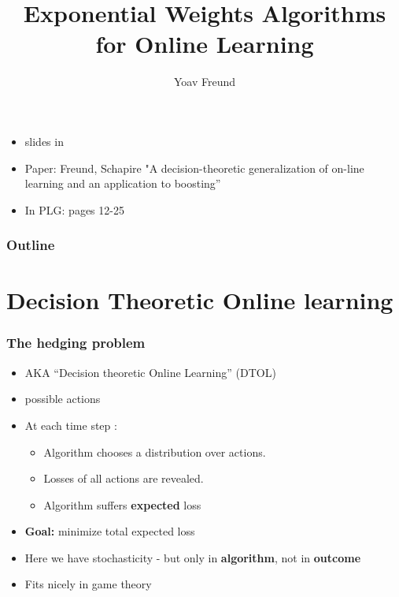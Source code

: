 \documentclass[handout]{beamer}
\title[\ouralg] %
{Exponential Weights Algorithms for Online Learning}
\author[Freund] %
{Yoav Freund}
\date{}
\institute[Universities of Somewhere and Elsewhere] %
\begin{document}

\begin{frame}
  \titlepage
  \begin{small}
    \begin{itemize}
    \item slides in \\
    \item Paper: Freund, Schapire "A decision-theoretic generalization of on-line learning and an application to boosting''
    \item In PLG: pages 12-25
    \end{itemize}
  \end{small}
\end{frame}

\begin{frame}
  \frametitle{Outline}
  \tableofcontents[pausesections]
\end{frame}


\section{Decision Theoretic Online learning}
\begin{frame}
\frametitle{The hedging problem}

\begin{itemize}
\item AKA ``Decision theoretic Online Learning'' (DTOL)
\item {} possible actions 

\item At each time step :
\begin{itemize}
\item Algorithm chooses a distribution  over actions.
\item Losses  of all actions  are revealed.
\item Algorithm suffers {\bf expected} loss 
\end{itemize}
\item {{\bf Goal:} minimize total expected loss}
\item {Here we have stochasticity - but only in {\bf algorithm}, not in {\bf outcome}}
\item {Fits nicely in game theory}
\end{itemize}
\end{frame}
\end{document}
